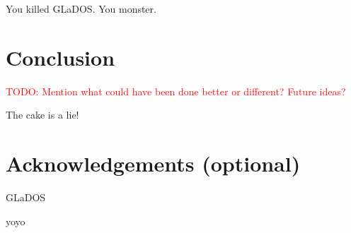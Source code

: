 \documentclass[a4paper]{IEEEtran}
\newcommand\TODO[1]{\textcolor{red}{TODO:#1}}
\newcommand\todo[1]{\TODO{#1}}
\begin{document}


You killed GLaDOS.
You monster.

\section{Conclusion}

\todo{ Mention what could have been done better or different? Future ideas? }

The cake is a lie!

\section{Acknowledgements (optional)}

GLaDOS

yoyo \cite{assignment-text}



\nocite{*}
\end{document}
